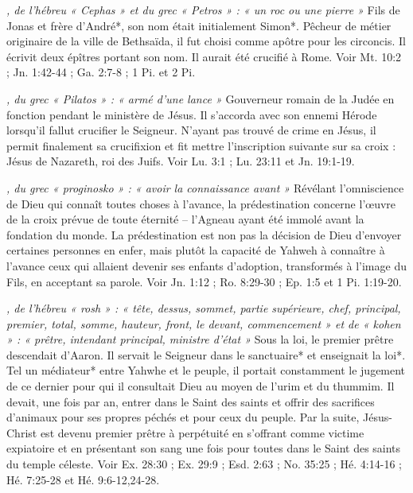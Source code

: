 \begin{multicols}{2}
\textit{, de l'hébreu « Cephas » et du grec « Petros » : « un roc ou une pierre »}\newline
Fils de Jonas et frère d'André*, son nom était initialement Simon*. Pêcheur de métier originaire de la ville de Bethsaïda, il fut choisi comme apôtre pour les circoncis. Il écrivit deux épîtres portant son nom. Il aurait été crucifié à Rome. Voir Mt. 10:2 ; Jn. 1:42-44 ; Ga. 2:7-8 ; 1 Pi. et 2 Pi.

\textit{, du grec « Pilatos » : « armé d'une lance »}\newline
Gouverneur romain de la Judée en fonction pendant le ministère de Jésus. Il s'accorda avec son ennemi Hérode lorsqu'il fallut crucifier le Seigneur. N'ayant pas trouvé de crime en Jésus, il permit finalement sa crucifixion et fit mettre l'inscription suivante sur sa croix : Jésus de Nazareth, roi des Juifs. Voir Lu. 3:1 ; Lu. 23:11 et Jn. 19:1-19.

\textit{, du grec « proginosko » : « avoir la connaissance avant »}\newline
Révélant l'omniscience de Dieu qui connaît toutes choses à l'avance, la prédestination concerne l'œuvre de la croix prévue de toute éternité – l'Agneau ayant été immolé avant la fondation du monde. La prédestination est non pas la décision de Dieu d'envoyer certaines personnes en enfer, mais plutôt la capacité de Yahweh à connaître à l'avance ceux qui allaient devenir ses enfants d'adoption, transformés à l'image du Fils, en acceptant sa parole. Voir Jn. 1:12 ; Ro. 8:29-30 ; Ep. 1:5 et 1 Pi. 1:19-20.

\textit{, de l'hébreu « rosh » : « tête, dessus, sommet, partie supérieure, chef, principal, premier, total, somme, hauteur, front, le devant, commencement » et de « kohen » : « prêtre, intendant principal, ministre d'état »}\newline
Sous la loi, le premier prêtre descendait d'Aaron. Il servait le Seigneur dans le sanctuaire* et enseignait la loi*. Tel un médiateur* entre Yahwhe et le peuple, il portait constamment le jugement de ce dernier pour qui il consultait Dieu au moyen de l'urim et du thummim. Il devait, une fois par an, entrer dans le Saint des saints et offrir des sacrifices d'animaux pour ses propres péchés et pour ceux du peuple. Par la suite, Jésus-Christ est devenu premier prêtre à perpétuité en s'offrant comme victime expiatoire et en présentant son sang une fois pour toutes dans le Saint des saints du temple céleste. Voir Ex. 28:30 ; Ex. 29:9 ; Esd. 2:63 ; No. 35:25 ; Hé. 4:14-16 ; Hé. 7:25-28 et Hé. 9:6-12,24-28.


\end{multicols}
